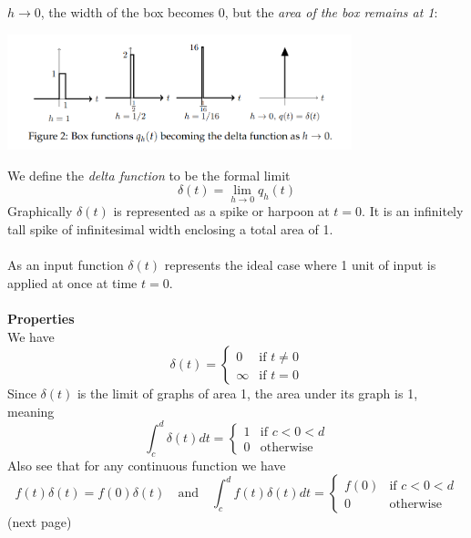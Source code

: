 \documentclass{report}
\begin{document}
$h\to0$, the width of the box becomes 0, but the \textit{area of the box remains at 1}:
\begin{center}
\includegraphics[width=10cm]{46}\\
\end{center}
We define the \textit{delta function} to be the formal limit
\begin{equation*}
\delta(t)=\lim_{h\to0}q_h(t)
\end{equation*}
Graphically $\delta(t)$ is represented as a spike or harpoon at $t=0$. It is an infinitely tall spike
of infinitesimal width enclosing a total area of 1.\\
\vspace{1mm}\\
As an input function $\delta(t)$ represents the ideal case where 1 unit of input is applied
at once at time $t=0$.\\
\vspace{1mm}\\
\textbf{Properties}\\
We have
\begin{equation*}
\delta(t)=\begin{cases}
0&\text{if }t\neq0\\
\infty&\text{if }t=0
\end{cases}
\end{equation*}
Since $\delta(t)$ is the limit of graphs of area 1, the area under its graph is 1, meaning
\begin{equation*}
\int^d_c\delta(t)dt=\begin{cases}
1&\text{if }c<0<d\\
0&\text{otherwise}
\end{cases}
\end{equation*}
Also see that for any continuous function we have
\begin{equation*}
f(t)\delta(t)=f(0)\delta(t)\quad\text{and}\quad
\int^d_cf(t)\delta(t)dt=\begin{cases}
f(0)&\text{if }c<0<d\\
0&\text{otherwise}
\end{cases}
\end{equation*}
(next page)\newpage
\end{document}
